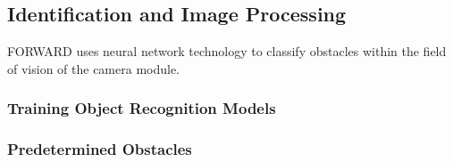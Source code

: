 \subsection{Identification and Image Processing}
\noindent FORWARD uses neural network technology to classify obstacles within the field of vision of the camera module.

\subsubsection{Training Object Recognition Models}

\subsubsection{Predetermined Obstacles}